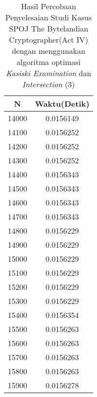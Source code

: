 \begin{table}[H]
\centering
\caption {Hasil Percobaan Penyelesaian Studi Kasus SPOJ The Bytelandian Cryptographer(Act IV) dengan menggunakan algoritma optimasi \textit{Kasiski Examination} dan \textit{Intersection} (3)}
\begin{tabular}{|c|c|}\hline
N&Waktu(Detik)\\ \hline
14000&0.0156149\\ \hline
14100&0.0156252\\ \hline
14200&0.0156252\\ \hline
14300&0.0156252\\ \hline
14400&0.0156343\\ \hline
14500&0.0156343\\ \hline
14600&0.0156343\\ \hline
14700&0.0156343\\ \hline
14800&0.0156229\\ \hline
14900&0.0156229\\ \hline
15000&0.0156229\\ \hline
15100&0.0156229\\ \hline
15200&0.0156229\\ \hline
15300&0.0156229\\ \hline
15400&0.0156354\\ \hline
15500&0.0156263\\ \hline
15600&0.0156263\\ \hline
15700&0.0156263\\ \hline
15800&0.0156263\\ \hline
15900&0.0156278\\ \hline
\end{tabular}
\label{tab:1res7}
\end{table}

